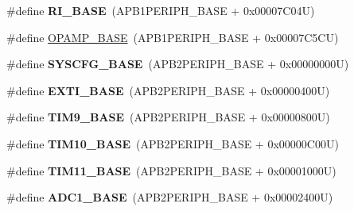 \begin{DoxyCompactItemize}
\item 
\hypertarget{group___peripheral__memory__map_ga8fdc749e6f184b3cd9b01f179af62e4c}{\#define {\bfseries R\-I\-\_\-\-B\-A\-S\-E}~(A\-P\-B1\-P\-E\-R\-I\-P\-H\-\_\-\-B\-A\-S\-E + 0x00007\-C04\-U)}\label{group___peripheral__memory__map_ga8fdc749e6f184b3cd9b01f179af62e4c}

\item 
\#define \hyperlink{group___peripheral__memory__map_ga6e9722d15c7ed794f0eca9682f64c03c}{O\-P\-A\-M\-P\-\_\-\-B\-A\-S\-E}~(A\-P\-B1\-P\-E\-R\-I\-P\-H\-\_\-\-B\-A\-S\-E + 0x00007\-C5\-C\-U)
\item 
\hypertarget{group___peripheral__memory__map_ga62246020bf3b34b6a4d8d0e84ec79d3d}{\#define {\bfseries S\-Y\-S\-C\-F\-G\-\_\-\-B\-A\-S\-E}~(A\-P\-B2\-P\-E\-R\-I\-P\-H\-\_\-\-B\-A\-S\-E + 0x00000000\-U)}\label{group___peripheral__memory__map_ga62246020bf3b34b6a4d8d0e84ec79d3d}

\item 
\hypertarget{group___peripheral__memory__map_ga87371508b3bcdcd98cd1ec629be29061}{\#define {\bfseries E\-X\-T\-I\-\_\-\-B\-A\-S\-E}~(A\-P\-B2\-P\-E\-R\-I\-P\-H\-\_\-\-B\-A\-S\-E + 0x00000400\-U)}\label{group___peripheral__memory__map_ga87371508b3bcdcd98cd1ec629be29061}

\item 
\hypertarget{group___peripheral__memory__map_ga92ae902be7902560939223dd765ece08}{\#define {\bfseries T\-I\-M9\-\_\-\-B\-A\-S\-E}~(A\-P\-B2\-P\-E\-R\-I\-P\-H\-\_\-\-B\-A\-S\-E + 0x00000800\-U)}\label{group___peripheral__memory__map_ga92ae902be7902560939223dd765ece08}

\item 
\hypertarget{group___peripheral__memory__map_ga3eff32f3801db31fb4b61d5618cad54a}{\#define {\bfseries T\-I\-M10\-\_\-\-B\-A\-S\-E}~(A\-P\-B2\-P\-E\-R\-I\-P\-H\-\_\-\-B\-A\-S\-E + 0x00000\-C00\-U)}\label{group___peripheral__memory__map_ga3eff32f3801db31fb4b61d5618cad54a}

\item 
\hypertarget{group___peripheral__memory__map_ga3a4a06bb84c703084f0509e105ffaf1d}{\#define {\bfseries T\-I\-M11\-\_\-\-B\-A\-S\-E}~(A\-P\-B2\-P\-E\-R\-I\-P\-H\-\_\-\-B\-A\-S\-E + 0x00001000\-U)}\label{group___peripheral__memory__map_ga3a4a06bb84c703084f0509e105ffaf1d}

\item 
\hypertarget{group___peripheral__memory__map_ga695c9a2f892363a1c942405c8d351b91}{\#define {\bfseries A\-D\-C1\-\_\-\-B\-A\-S\-E}~(A\-P\-B2\-P\-E\-R\-I\-P\-H\-\_\-\-B\-A\-S\-E + 0x00002400\-U)}\label{group___peripheral__memory__map_ga695c9a2f892363a1c942405c8d351b91}


\end{DoxyCompactItemize}
